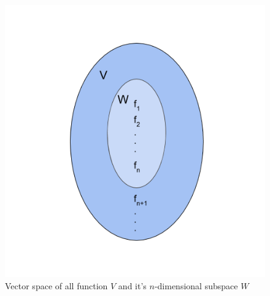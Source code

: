 \begin{figure}[h!]
\centering
\includegraphics[scale=0.4]{solutions/3/6/3/fig/vector_space.png}
\caption{Vector space of all function $V$ and it's $n$-dimensional subspace $W$}
\label{eq:solutions/3/6/3/fig/1}
\end{figure}
